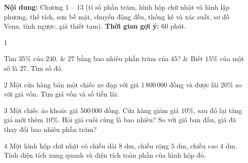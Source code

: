 \begin{knowbox}
\textbf{Nội dung:} Chương 1 -- 13 (tỉ số phần trăm, hình hộp chữ nhật và hình lập phương, thể tích, sơn bề mặt, chuyển động đều, thống kê và xác suất, sơ đồ Venn, tính ngược, giả thiết tạm). \quad \textbf{Thời gian gợi ý:} $60$ phút.
\end{knowbox}
\gap
\begin{probbox}{1}{\relax}
\begin{cols3}
 Tìm $35\%$ của $240$. &  $27$ bằng bao nhiêu phần trăm của $45$? &  Biết $15\%$ của một số là $27$. Tìm số đó.
\end{cols3}
\end{probbox}
\gap
\begin{probbox}{2}{\relax}
Một cửa hàng bán một chiếc xe đạp với giá $1\,800\,000$ đồng và được lãi $20\%$ so với giá vốn. Tìm giá vốn và số tiền lãi.
\end{probbox}
\gap
\begin{probbox}{3}{\relax}
Một chiếc áo khoác giá $500\,000$ đồng. Cửa hàng giảm giá $10\%$, sau đó lại tăng giá mới thêm $10\%$. Hỏi giá cuối cùng là bao nhiêu? So với giá ban đầu, giá đã thay đổi bao nhiêu phần trăm?
\end{probbox}
\gap
\begin{probbox}{4}{\relax}
Một hình hộp chữ nhật có chiều dài $8$ dm, chiều rộng $5$ dm, chiều cao $4$ dm. Tính diện tích xung quanh và diện tích toàn phần của hình hộp đó.
\end{probbox}
